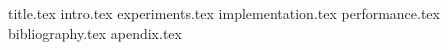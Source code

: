 \documentclass[12pt]{article}
\newcommand*{\sectiondir}{sections/}
\begin{document}
	{title.tex}
	\tableofcontents
	\newpage
	{intro.tex}
	{experiments.tex}
	{implementation.tex}
	{performance.tex}
	{bibliography.tex}
	{apendix.tex}
\end{document}
